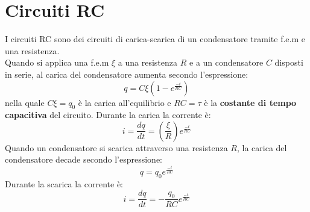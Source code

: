     \section{Circuiti RC} I circuiti RC sono dei circuiti di carica-scarica di
    un condensatore tramite f.e.m e una resistenza. \\
    Quando si applica una f.e.m $\xi$ a una resistenza $R$ e a un condensatore 
    $C$ disposti in serie, al carica del condensatore aumenta secondo 
    l'espressione:
        \begin{equation}
            q = C\xi(1-e^{\frac{-t}{RC}})
        \end{equation}
    nella quale $C\xi = q_0$ è la carica all'equilibrio e $RC = \tau$ è la 
    \textbf{costante di tempo capacitiva} del circuito. Durante la carica la 
    corrente è:
        \begin{equation}
            i = \frac{dq}{dt} = (\frac{\xi}{R})e^{\frac{-t}{RC}}
        \end{equation}
    Quando un condensatore si scarica attraverso una resistenza $R$, la carica
    del condensatore decade secondo l'espressione:
        \begin{equation}
            q = q_0e^{\frac{-t}{RC}}
        \end{equation}
    Durante la scarica la corrente è:
        \begin{equation}
            i = \frac{dq}{dt} = -\frac{q_0}{RC}e^{\frac{-t}{RC}}
        \end{equation}
